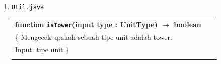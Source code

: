 \documentclass{article}
\newenvironment{pseudobox}
{
\centering
\begin{longtable}{|p{0.94\linewidth}|}
\hline
}
{
\\ \hline
\end{longtable}
\vspace{0.05cm}
}
\begin{document}
\begin{enumerate}[label=\alph*.]
\begin{enumerate}[label=\alph*.]
\begin{pseudobox}
\textbf{Algorithm} \\
\hspace*{1.5em}\texttt{cnt} $\leftarrow 0$ \\
\hspace*{1.5em}for \texttt{i} $\leftarrow$ \texttt{HIST}-1 downto 0 do \\
\hspace*{3em}if \texttt{recentLocs[i]} $\neq$ null and \texttt{recentLocs[i] = loc} then \\
\hspace*{4.5em}\texttt{cnt} $\leftarrow$ \texttt{cnt} + 1 \\
\hspace*{3em}endif \\
\hspace*{1.5em}endfor \\
\hspace*{1.5em}return \texttt{cnt}
\end{pseudobox}

\begin{pseudobox}
\textbf{function \texttt{paintPct}() $\rightarrow$ integer} \\
\{ Mengembalikan persentase paint unit saat ini. \} \\

\textbf{Kamus:} \\
\hspace*{1.5em}\texttt{cap} : integer

\textbf{Algorithm} \\
\hspace*{1.5em}\texttt{cap} $\leftarrow$ \texttt{myType.paintCapacity} \\
\hspace*{1.5em}if \texttt{cap} $\leq 0$ then \\
\hspace*{3em}return 100 \\
\hspace*{1.5em}else \\
\hspace*{3em}return \texttt{paint * 100 div cap} \\
\hspace*{1.5em}endif
\end{pseudobox}

\item \texttt{Util.java}

\begin{pseudobox}
\textbf{function \texttt{isTower}(input type : UnitType) $\rightarrow$ boolean} \\
\{ Mengecek apakah sebuah tipe unit adalah tower. \\
Input: tipe unit
\}\\


\end{pseudobox}
\end{enumerate}
\end{enumerate}
\end{document}
